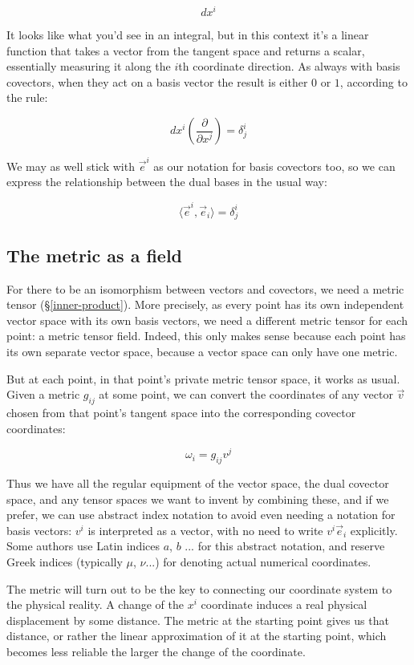 $$
dx^i
$$

It looks like what you'd see in an integral, but in this context it's a linear function that takes a vector from the tangent space and returns a scalar, essentially measuring it along the $i$th coordinate direction. As always with basis covectors, when they act on a basis vector the result is either $0$ or $1$, according to the rule:

$$
dx^i \left( \frac{\partial}{\partial x^j} \right)
=
\delta^i_j
$$

We may as well stick with $\vec{e}^{i}$ as our notation for basis covectors too, so we can express the relationship between the dual bases in the usual way:

$$
\langle \vec{e}^i , \vec{e}_i \rangle = \delta^i_j
$$

\subsection{The metric as a field}

For there to be an isomorphism between vectors and covectors, we need a metric tensor (§\ref{inner-product}). More precisely, as every point has its own independent vector space with its own basis vectors, we need a different metric tensor for each point: a metric tensor field. Indeed, this only makes sense because each point has its own separate vector space, because a vector space can only have one metric.

But at each point, in that point's private metric tensor space, it works as usual. Given a metric $g_{ij}$ at some point, we can convert the coordinates of any vector $\vec{v}$ chosen from that point's tangent space into the corresponding covector coordinates:

$$
\omega_i = g_{ij} v^j
$$

Thus we have all the regular equipment of the vector space, the dual covector space, and any tensor spaces we want to invent by combining these, and if we prefer, we can use abstract index notation to avoid even needing a notation for basis vectors: $v^i$ is interpreted as a vector, with no need to write $v^i \vec{e}_i$ explicitly. Some authors use Latin indices $a$, $b$ ... for this abstract notation, and reserve Greek indices (typically $\mu$, $\nu$...) for denoting actual numerical coordinates.

The metric will turn out to be the key to connecting our coordinate system to the physical reality. A change of the $x^i$ coordinate induces a real physical displacement by some distance. The metric at the starting point gives us that distance, or rather the linear approximation of it at the starting point, which becomes less reliable the larger the change of the coordinate.

